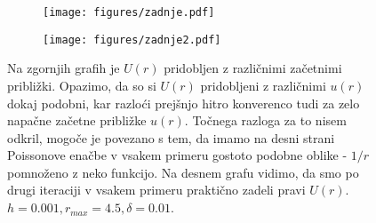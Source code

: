 \documentclass{article}
\begin{document}
\begin{figure}[H]
\centering
\begin{subfigure}{.49\textwidth}
\texttt{[image: figures/zadnje.pdf]}
\end{subfigure}
\begin{subfigure}{.49\textwidth}
\texttt{[image: figures/zadnje2.pdf]}
\end{subfigure}
\caption*{Na zgornjih grafih je $U(r)$ pridobljen z različnimi začetnimi približki. Opazimo, da so si $U(r)$ pridobljeni z različnimi $u(r)$ dokaj podobni, kar razloći prejšnjo hitro konverenco tudi za zelo napačne začetne približke $u(r)$. Točnega razloga za to nisem odkril, mogoče je povezano s tem, da imamo na desni strani Poissonove enačbe v vsakem primeru gostoto podobne oblike - $1/r$ pomnoženo z neko funkcijo. Na desnem grafu vidimo, da smo po drugi iteraciji v vsakem primeru praktično zadeli pravi $U(r)$. $h=0.001, r_{max}=4.5, \delta=0.01$.}
\end{figure}
\end{document}
